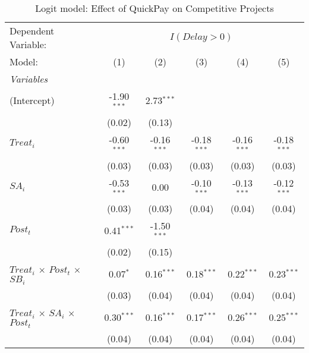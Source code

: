 \documentclass[
]{article}
\begin{document}
\begin{table}[htbp]
   \centering
   \caption{Logit model: Effect of QuickPay on Competitive Projects}
   \begin{tabular}{lccccc}
      \tabularnewline\midrule\midrule
      Dependent Variable: & \multicolumn{5}{c}{$I(Delay>0)$}\\
      Model:                                        & (1)           & (2)           & (3)           & (4)           & (5)\\
      \midrule \emph{Variables} &   &   &   &   &  \\
      (Intercept)                                   & -1.90$^{***}$ & 2.73$^{***}$  &               &               &   \\
                                                    & (0.02)        & (0.13)        &               &               &   \\
      $Treat_i$                                     & -0.60$^{***}$ & -0.16$^{***}$ & -0.18$^{***}$ & -0.16$^{***}$ & -0.18$^{***}$\\
                                                    & (0.03)        & (0.03)        & (0.03)        & (0.03)        & (0.03)\\
      $SA_i$                                        & -0.53$^{***}$ & 0.00          & -0.10$^{***}$ & -0.13$^{***}$ & -0.12$^{***}$\\
                                                    & (0.03)        & (0.03)        & (0.04)        & (0.04)        & (0.04)\\
      $Post_t$                                      & 0.41$^{***}$  & -1.50$^{***}$ &               &               &   \\
                                                    & (0.02)        & (0.15)        &               &               &   \\
      $Treat_i$ $\times$ $Post_t$ $\times$ $SB_i$ & 0.07$^{*}$    & 0.16$^{***}$  & 0.18$^{***}$  & 0.22$^{***}$  & 0.23$^{***}$\\
                                                    & (0.03)        & (0.04)        & (0.04)        & (0.04)        & (0.04)\\
      $Treat_i$ $\times$ $SA_i$ $\times$ $Post_t$ & 0.30$^{***}$  & 0.16$^{***}$  & 0.17$^{***}$  & 0.26$^{***}$  & 0.25$^{***}$\\
                                                    & (0.04)        & (0.04)        & (0.04)        & (0.04)        & (0.04)\\

\end{tabular}
\end{table}
\end{document}
